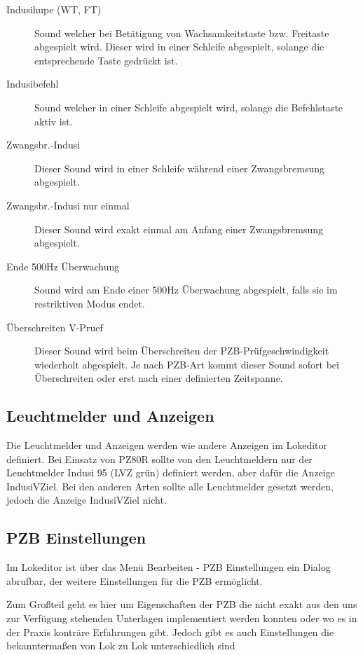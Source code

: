 \begin{description}
\item[Indusihupe (WT, FT)]
Sound welcher bei Betätigung von Wachsamkeitstaste bzw. Freitaste
abgespielt wird. Dieser wird in einer Schleife abgespielt, solange die
entsprechende Taste gedrückt ist.
\item[Indusibefehl]
Sound welcher in einer Schleife abgespielt wird, solange die
Befehlstaste aktiv ist.
\item[Zwangsbr.-Indusi]
Dieser Sound wird in einer Schleife während einer Zwangsbremsung
abgespielt.
\item[Zwangsbr.-Indusi nur einmal]
Dieser Sound wird exakt einmal am Anfang einer Zwangsbremsung
abgespielt.
\item[Ende 500Hz Überwachung]
Sound wird am Ende einer 500Hz Überwachung abgespielt, falls sie im
restriktiven Modus endet.
\item[Überschreiten V-Pruef]
Dieser Sound wird beim Überschreiten der PZB-Prüfgeschwindigkeit
wiederholt abgespielt. Je nach PZB-Art kommt dieser Sound sofort bei
Überschreiten oder erst nach einer definierten Zeitspanne.
\end{description}

\subsection{Leuchtmelder und Anzeigen}

Die Leuchtmelder und Anzeigen werden wie andere Anzeigen im Lokeditor
definiert. Bei Einsatz von PZ80R sollte von den Leuchtmeldern nur der
Leuchtmelder Indusi 95 (LVZ grün) definiert werden, aber dafür die
Anzeige IndusiVZiel. Bei den anderen Arten sollte alle Leuchtmelder
gesetzt werden, jedoch die Anzeige IndusiVZiel nicht.

\subsection{PZB Einstellungen}
\label{sec.editor.pzb.einstellungen}

Im Lokeditor ist über das Menü Bearbeiten - PZB Einstellungen ein Dialog
abrufbar, der weitere Einstellungen für die PZB ermöglicht.

Zum Großteil geht es hier um Eigenschaften der PZB die nicht exakt aus
den uns zur Verfügung stehenden Unterlagen implementiert werden konnten
oder wo es in der Praxis konträre Erfahrungen gibt. Jedoch gibt es auch
Einstellungen die bekanntermaßen von Lok zu Lok unterschiedlich sind

